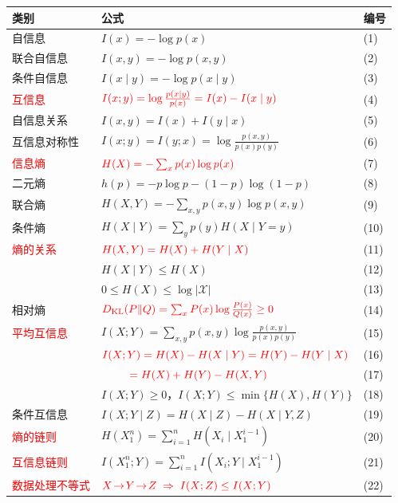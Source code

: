 {\scriptsize
\begin{tabularx}{\textwidth}{@{}l>{\raggedright\arraybackslash}X>{\raggedleft\arraybackslash}p{1.8em}@{}}
\toprule
\textbf{类别} & \textbf{公式} & \textbf{编号} \\
\midrule
自信息 & $I(x)=-\log p(x)$ & (1) \\
联合自信息 & $I(x,y)=-\log p(x,y)$ & (2) \\
条件自信息 & $I(x\mid y)=-\log p(x\mid y)$ & (3) \\
\textcolor{Red}{互信息} & $\textcolor{Red}{I(x;y)=\log\frac{p(x\mid y)}{p(x)}=I(x)-I(x\mid y)}$ & (4) \\
自信息关系 & $I(x,y)=I(x)+I(y\mid x)$ & (5) \\
互信息对称性 & $I(x;y)=I(y;x)=\log\frac{p(x,y)}{p(x)p(y)}$ & (6) \\
\midrule
\textcolor{Red}{信息熵} & $\textcolor{Red}{H(X)=-\sum_x p(x)\log p(x)}$ & (7) \\
二元熵 & $h(p)=-p\log p-(1-p)\log(1-p)$ & (8) \\
联合熵 & $H(X,Y)=-\sum_{x,y}p(x,y)\log p(x,y)$ & (9) \\
条件熵 & $H(X\mid Y)=\sum_y p(y)H(X\mid Y=y)$ & (10) \\
\midrule
\textcolor{Red}{熵的关系} & $\textcolor{Red}{H(X,Y)=H(X)+H(Y\mid X)}$ & (11) \\
 & $H(X\mid Y)\le H(X)$ & (12) \\
 & $0\le H(X)\le\log|\mathcal{X}|$ & (13) \\
\midrule
相对熵 & $\textcolor{Red}{\KL(P\|Q)=\sum_x P(x)\log\frac{P(x)}{Q(x)}\ge 0}$ & (14) \\
\midrule
\textcolor{Red}{平均互信息} & $I(X;Y)=\sum_{x,y}p(x,y)\log\frac{p(x,y)}{p(x)p(y)}$ & (15) \\
 & $\textcolor{Red}{I(X;Y)=H(X)-H(X\mid Y)=H(Y)-H(Y\mid X)}$ & (16) \\
 & $\textcolor{Red}{\;\,\qquad=H(X)+H(Y)-H(X,Y)}$ & (17) \\
 & $I(X;Y)\ge 0$，$I(X;Y)\le\min\{H(X),H(Y)\}$ & (18) \\
条件互信息 & $I(X;Y\mid Z)=H(X\mid Z)-H(X\mid Y,Z)$ & (19) \\
\midrule
\textcolor{Red}{熵的链则} & $H(X_1^n)=\sum_{i=1}^{n}H(X_i\mid X_1^{i-1})$ & (20) \\
\textcolor{Red}{互信息链则} & $I(X_1^n;Y)=\sum_{i=1}^{n}I(X_i;Y\mid X_1^{i-1})$ & (21) \\
\midrule
\textcolor{Red}{数据处理不等式} & $\textcolor{Red}{X\!\to\!Y\!\to\!Z\;\Rightarrow\;I(X;Z)\le I(X;Y)}$ & (22) \\
\bottomrule
\end{tabularx}
}

